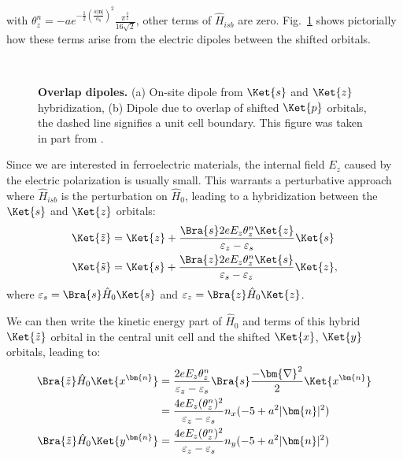 with $\theta_z^n = -ae^{-\frac{1}{2}\left(\frac{a|\bm{n}|}{a_0}\right)^2}\frac{\pi^{\frac{3}{2}}}{16\sqrt{2}}$, other terms of $\hat{H}_{isb}$ are zero.
Fig.~\ref{fig:Rashba_overlapdip} shows pictorially how these terms arise from the electric dipoles between the shifted orbitals. 
\begin{figure}[t]
~\centering
{}\caption{\label{fig:Rashba_overlapdip} {\bf Overlap dipoles.} (a) On-site dipole from $\Ket{s}$ and $\Ket{z}$ hybridization, (b) Dipole due to overlap of shifted $\Ket{p}$ orbitals, the dashed line signifies a unit cell boundary. This figure was taken in part from \cite{Ponet2018}.}
\end{figure}
Since we are interested in ferroelectric materials, the internal field $E_z$ caused by the electric polarization is usually small.
This warrants a perturbative approach where $\hat{H}_{isb}$ is the perturbation on $\hat{H}_0$, leading to a hybridization between the $\Ket{s}$ and $\Ket{z}$ orbitals:
\begin{align}
	\Ket{\tilde{z}} &= \Ket{z} + \frac{\Bra{s} 2 e E_z \theta^n_z\Ket{z}}{\varepsilon_z - \varepsilon_s}\Ket{s}\\
	\Ket{\tilde{s}}   &= \Ket{s} + \frac{\Bra{z} 2 e E_z \theta^n_z\Ket{s}}{\varepsilon_s - \varepsilon_z}\Ket{z},
\end{align}
where $\varepsilon_s = \Bra{s} \hat{H}_0 \Ket{s}$ and $\varepsilon_z = \Bra{z} \hat{H}_0 \Ket{z}$.

We can then write the kinetic energy part of $\hat{H}_0$ and terms of this hybrid $\Ket{\tilde{z}}$ orbital in the central unit cell and the shifted $\Ket{x}$, $\Ket{y}$ orbitals, leading to:
\begin{align}
	\Bra{\tilde{z}} \hat{H}_0 \Ket{x^{\bm{n}}} &= \frac{2 e E_z \theta_z^n}{\varepsilon_z - \varepsilon_s}\Bra{s} \frac{-\bm{\nabla}^2}{2} \Ket{x^{\bm{n}}}\\
	&= \frac{4 e E_z (\theta_z^n)^2}{\varepsilon_z - \varepsilon_s} n_x (-5 + a^2 |\bm{n}|^2)\\
	\Bra{\tilde{z}} \hat{H}_0 \Ket{y^{\bm{n}}} &= \frac{4 e E_z (\theta_z^n)^2}{\varepsilon_z - \varepsilon_s} n_y (-5 + a^2 |\bm{n}|^2)
\end{align}

